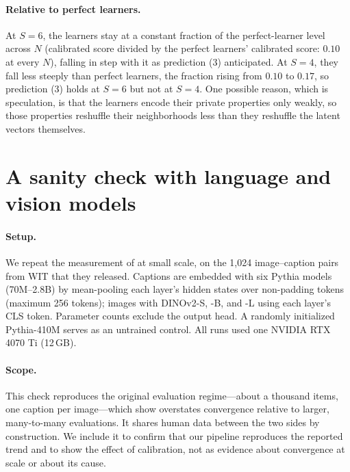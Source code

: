 \documentclass[11pt]{article}
\begin{document}
\paragraph{Relative to perfect learners.} At $S=6$, the learners stay at a constant fraction of the perfect-learner level across $N$ (calibrated score divided by the perfect learners' calibrated score: $0.10$ at every $N$), falling in step with it as prediction (3) anticipated. At $S=4$, they fall less steeply than perfect learners, the fraction rising from $0.10$ to $0.17$, so prediction (3) holds at $S=6$ but not at $S=4$. One possible reason, which is speculation, is that the learners encode their private properties only weakly, so those properties reshuffle their neighborhoods less than they reshuffle the latent vectors themselves.

\section{A sanity check with language and vision models}
\label{sec:textvision}

\paragraph{Setup.} We repeat the measurement of \citet{huh2024platonic} at small scale, on the 1{,}024 image--caption pairs from WIT \citep{srinivasan2021wit} that they released. Captions are embedded with six Pythia models \citep{biderman2023pythia} (70M--2.8B) by mean-pooling each layer's hidden states over non-padding tokens (maximum 256 tokens); images with DINOv2-S, -B, and -L \citep{oquab2023dinov2} using each layer's CLS token. Parameter counts exclude the output head. A randomly initialized Pythia-410M serves as an untrained control. All runs used one NVIDIA RTX 4070 Ti (12\,GB).

\paragraph{Scope.} This check reproduces the original evaluation regime---about a thousand items, one caption per image---which \citet{koepke2026cave} show overstates convergence relative to larger, many-to-many evaluations. It shares human data between the two sides by construction. We include it to confirm that our pipeline reproduces the reported trend and to show the effect of calibration, not as evidence about convergence at scale or about its cause.
\end{document}
